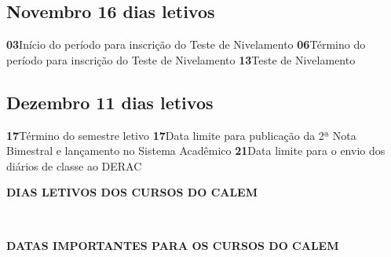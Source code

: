 \documentclass[thesis]{hmcposter}
\begin{document}
\begin{poster}
							\subsection{Novembro \hfill 16 dias letivos}\textbf{03}\qquad Início do período para inscrição do Teste de Nivelamento \newline \null\textbf{06}\qquad Término do período para inscrição do Teste de Nivelamento \newline \null\textbf{13}\qquad Teste de Nivelamento \newline \null\subsection{Dezembro \hfill 11 dias letivos}\textbf{17}\qquad Término do semestre letivo \newline \null\textbf{17}\qquad Data limite para publicação da 2ª Nota Bimestral e lançamento no Sistema Acadêmico \newline \null\textbf{21}\qquad Data limite para o envio dos diários de classe ao DERAC \newline \null\newpage
~
\vfill
\begin{center}
\large \textbf{DIAS LETIVOS DOS CURSOS DO CALEM}
\newline
\null
\newline
\begin{table}
\centering
{}
\end{table}
\newline
\null
\newline
\end{center}
\vfill
\null
\columnbreak
~
\vfill
\begin{center}
\large \textbf{DATAS IMPORTANTES PARA OS CURSOS DO CALEM}
\newline
\null
\newline
\begin{table}

\end{table}
\end{center}
\end{poster}
\end{document}
